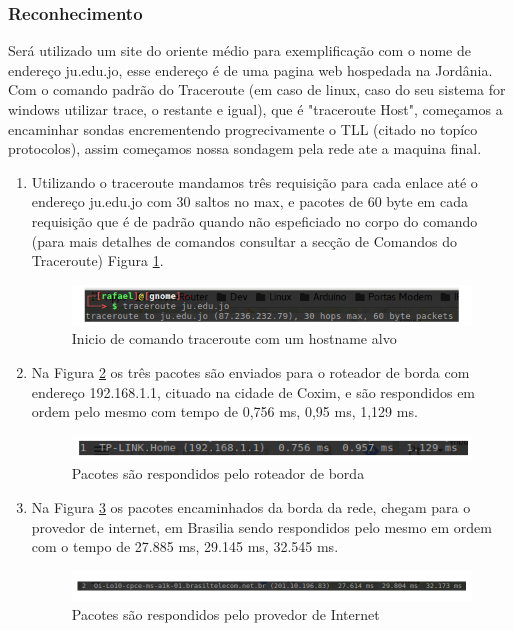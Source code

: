 \documentclass[
	article,			%
	11pt,				%
	oneside,			%
	a4paper,			%
	english,			%
	brazil,				%
	sumario=tradicional
	]{abntex2}
\begin{document}
\subsubsection{Reconhecimento}
 Será utilizado um site do oriente médio para exemplificação com o nome de endereço ju.edu.jo, esse endereço é de uma pagina web hospedada na Jordânia.
 Com o comando padrão do Traceroute (em caso de linux, caso do seu sistema for windows utilizar trace, o restante e igual), que é "traceroute Host", começamos a encaminhar sondas encrementendo progrecivamente o TLL (citado no topíco protocolos), assim começamos nossa sondagem pela rede ate a maquina final. 
 \begin{enumerate}
 	\item
 	Utilizando o traceroute mandamos três requisição para cada enlace até o endereço ju.edu.jo com 30 saltos no max, e pacotes de 60 byte em cada requisição que é de padrão quando não espeficiado no corpo do comando (para mais detalhes de comandos consultar a secção de Comandos do Traceroute) Figura \ref{rota-1}.
 		\begin{figure}[h]
	 		\centering
	 		\includegraphics[scale=0.65]{./rota-1.png}
	 		\caption{Inicio de comando traceroute com um hostname alvo}
	 		\label{rota-1}
	 	\end{figure}
 	
 	\item
 	Na Figura \ref{rota-2} os três pacotes são enviados para o roteador de borda com endereço 192.168.1.1, cituado na cidade de Coxim, e são respondidos em ordem pelo mesmo com tempo de 0,756 ms, 0,95 ms, 1,129 ms.
 	\begin{figure}[h]
 		\centering
 		\includegraphics[scale=0.7]{./rota-2.png}
 		\caption{Pacotes são respondidos pelo roteador de borda}
 		\label{rota-2}
 	\end{figure}
 	
 	\item
 	Na Figura \ref{rota-3} os pacotes encaminhados da borda da rede, chegam para o provedor de internet, em Brasilia sendo respondidos pelo mesmo em ordem com o tempo de 27.885 ms, 29.145 ms, 32.545 ms.	
 	
 	\begin{figure}[h]
 		\centering
 		\includegraphics[scale=0.56]{./rota-3.png}
 		\caption{Pacotes são respondidos pelo provedor de Internet}
 		\label{rota-3}
 	\end{figure}
 

\end{enumerate}
\end{document}
